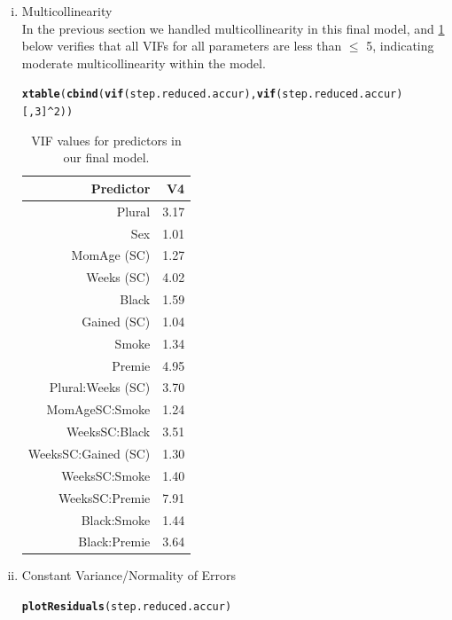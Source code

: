 \documentclass{article}\usepackage[]{graphicx}\usepackage[]{xcolor}
\makeatletter
\newcommand{\hlnum}[1]{\textcolor[rgb]{0.686,0.059,0.569}{#1}}%
\newcommand{\hlopt}[1]{\textcolor[rgb]{0,0,0}{#1}}%
\newcommand{\hlstd}[1]{\textcolor[rgb]{0.345,0.345,0.345}{#1}}%
\newcommand{\hlkwd}[1]{\textcolor[rgb]{0.737,0.353,0.396}{\textbf{#1}}}%
\newenvironment{kframe}{%
 \def\at@end@of@kframe{}%
 \ifinner\ifhmode%
  \def\at@end@of@kframe{\end{minipage}}%
  \begin{minipage}{\columnwidth}%
 \fi\fi%
 \def\FrameCommand##1{\hskip\@totalleftmargin \hskip-\fboxsep
 \colorbox{shadecolor}{##1}\hskip-\fboxsep
     \hskip-\linewidth \hskip-\@totalleftmargin \hskip\columnwidth}%
 \MakeFramed {\advance\hsize-\width
   \@totalleftmargin\z@ \linewidth\hsize
   \@setminipage}}%
 {\par\unskip\endMakeFramed%
 \at@end@of@kframe}
\newenvironment{knitrout}{}{} %
\makeatother
\begin{document}
\begin{enumerate}[a.]
\begin{enumerate}[i.]
\item Multicollinearity \\
In the previous section we handled multicollinearity in this final model, and \ref{VIF Values} below verifies that all VIFs for all parameters are less than $\leq$ 5, indicating moderate multicollinearity within the model. 

\begin{knitrout}
\color{fgcolor}\begin{kframe}
\begin{alltt}
\hlkwd{xtable}\hlstd{(}\hlkwd{cbind}\hlstd{(}\hlkwd{vif}\hlstd{(step.reduced.accur),} \hlkwd{vif}\hlstd{(step.reduced.accur)[,}\hlnum{3}\hlstd{]}\hlopt{^}\hlnum{2}\hlstd{))}
\end{alltt}
\end{kframe}
\end{knitrout}
\begin{table}[H]
\centering
\begin{tabular}{rr}
  \hline
  Predictor & V4 \\ 
  \hline
  Plural & 3.17 \\ 
  Sex & 1.01 \\ 
  MomAge (SC) & 1.27 \\ 
  Weeks (SC) & 4.02 \\ 
  Black & 1.59 \\ 
  Gained (SC) & 1.04 \\ 
  Smoke & 1.34 \\ 
  Premie & 4.95 \\ 
  Plural:Weeks (SC) & 3.70 \\ 
  MomAgeSC:Smoke & 1.24 \\ 
  WeeksSC:Black & 3.51 \\ 
  WeeksSC:Gained (SC) & 1.30 \\ 
  WeeksSC:Smoke & 1.40 \\ 
  WeeksSC:Premie & 7.91 \\ 
  Black:Smoke & 1.44 \\ 
  Black:Premie & 3.64 \\ 
   \hline
\end{tabular}
\label{VIF Values}
\caption{VIF values for predictors in our final model.}
\end{table}

\item Constant Variance/Normality of Errors\\
\begin{knitrout}
\color{fgcolor}\begin{kframe}
\begin{alltt}
\hlkwd{plotResiduals}\hlstd{(step.reduced.accur)}
\end{alltt}
\end{kframe}
\end{knitrout}


\end{enumerate}
\end{enumerate}
\end{document}
